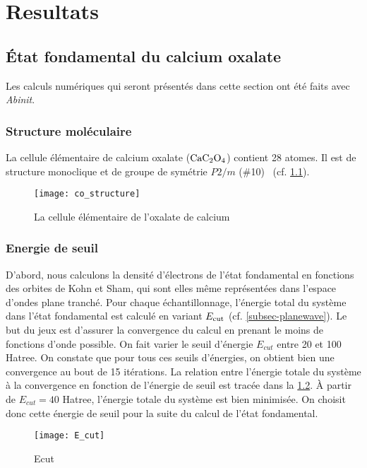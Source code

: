 \chapter{Resultats}
\label{chap-results}

\section{État fondamental du calcium oxalate}
Les calculs numériques qui seront présentés dans cette section ont été faits avec \textit{Abinit}.

\subsection{Structure moléculaire}
La cellule élémentaire de calcium oxalate ($\textnormal{Ca} \textnormal{C}_2 \textnormal{O}_4$) contient 28 atomes.
Il est de structure monoclique et de groupe de symétrie $P2/m$ ($\#$10)~\cite{Kolezynski2010} (cf. \cref{BrillouinZone}).

\begin{figure}[!h]
  \centering
  \texttt{[image: co\_structure]}
  \caption{La cellule élémentaire de l'oxalate de calcium}\label{BrillouinZone}
\end{figure}

\subsection{Energie de seuil}
D'abord, nous calculons la densité d'électrons de l'état fondamental
en fonctions des orbites de Kohn et Sham,
qui sont elles même représentées dans l'espace d'ondes plane tranché.
Pour chaque échantillonnage, l'énergie total du système dans l'état fondamental est calculé
en variant $E_{\textnormal{cut}}$ (cf. \cref{subsec-planewave}).
Le but du jeux est d'assurer la convergence du calcul en prenant le moins de fonctions d'onde possible.
On fait varier le seuil d'énergie $E_{cut}$ entre 20 et 100 Hatree.
On constate que pour tous ces seuils d'énergies, on obtient bien une convergence au bout de 15 itérations.
La relation entre l'énergie totale du système à la convergence
en fonction de l'énergie de seuil est tracée dans la \cref{fig-Ecut}.
À partir de $E_{cut} = 40$ Hatree, l'énergie totale du système est bien minimisée.
On choisit donc cette énergie de seuil pour la suite du calcul de l'état fondamental.

\begin{figure}[!h]
    \centering
    \texttt{[image: E\_cut]}
    \caption{Ecut}\label{fig-Ecut}
\end{figure}

